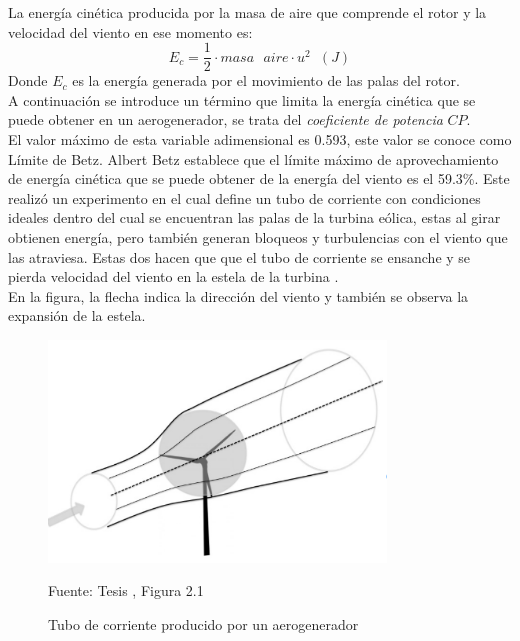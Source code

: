 La energía cinética producida por la masa de aire que comprende el rotor y la velocidad del viento en ese momento es:
\begin{equation}
    E_c = \dfrac{1}{2} \cdot masa \text{ } aire \cdot u^2 \hspace{7pt} (J)
\end{equation}
Donde $E_c$ es la energía generada por el movimiento de las palas del rotor.\\


A continuación se introduce un término que limita la energía cinética que se puede obtener en un aerogenerador, se trata del \textit{coeficiente de potencia} $CP$.\\

El valor máximo de esta variable adimensional es 0.593, este valor se conoce como Límite de Betz. Albert Betz establece que el límite máximo de aprovechamiento de energía cinética que se puede obtener de la energía del viento es el 59.3\%. Este realizó un experimento en el cual define un tubo de corriente con condiciones ideales dentro del cual se encuentran las palas de la turbina eólica, estas al girar obtienen energía, pero también generan bloqueos y turbulencias con el viento que las atraviesa. Estas dos hacen que que el tubo de corriente se ensanche y se pierda velocidad del viento en la estela de la turbina \cite{NEILL201883}.\\


En la figura, la flecha indica la dirección del viento y también se observa la expansión de la estela.

\begin{figure}[H]
    \centering
    \includegraphics[width=0.8\textwidth]{images/Figura articulo Modelling Smart Wind Turbine Blades.PNG}
    \caption{Tubo de corriente producido por un aerogenerador}
    Fuente: Tesis \cite{Vinit2015}, Figura 2.1
    \label{fig:Tubo_corriente_betz}
\end{figure}



